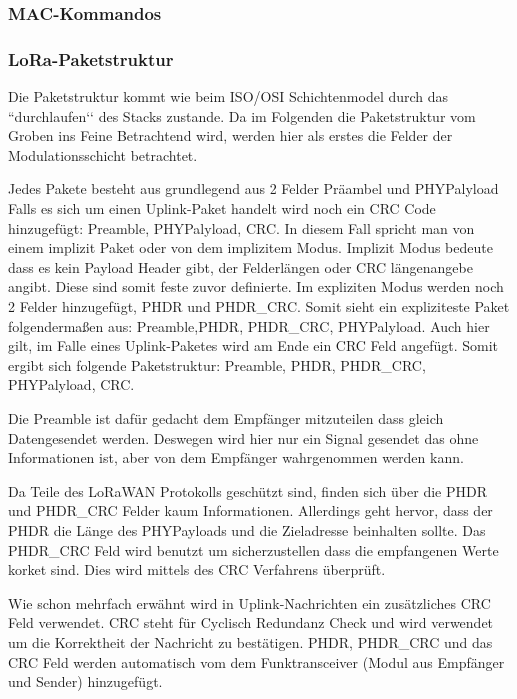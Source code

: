\documentclass[a4paper,12pt]{article}
\begin{document}
            \subsubsection{MAC-Kommandos}
            \subsubsection{LoRa-Paketstruktur}
            Die Paketstruktur kommt wie beim ISO/OSI Schichtenmodel durch das ``durchlaufen‘‘ des Stacks zustande. 
            Da im Folgenden die Paketstruktur vom Groben ins Feine Betrachtend wird, werden hier als erstes die Felder
            der Modulationsschicht betrachtet.

            Jedes Pakete besteht aus grundlegend aus 2 Felder Präambel und  PHYPalyload Falls es sich um einen 
            Uplink-Paket handelt wird noch ein CRC Code hinzugefügt: Preamble, PHYPalyload, CRC. 
            In diesem Fall spricht man von einem implizit Paket oder von dem implizitem Modus. Implizit Modus bedeute 
            dass es kein Payload Header gibt, der Felderlängen oder CRC längenangebe angibt. Diese sind somit feste 
            zuvor definierte. Im expliziten Modus werden noch 2 Felder hinzugefügt, PHDR und PHDR\_CRC. Somit sieht 
            ein expliziteste Paket folgendermaßen aus:  Preamble,PHDR, PHDR\_CRC, PHYPalyload. Auch hier gilt, im Falle
             eines Uplink-Paketes wird am Ende ein CRC Feld angefügt. Somit ergibt sich folgende Paketstruktur: 
             Preamble, PHDR, PHDR\_CRC, PHYPalyload, CRC.

            Die Preamble ist dafür gedacht dem Empfänger mitzuteilen dass gleich Datengesendet werden. Deswegen wird 
            hier nur ein Signal gesendet das ohne Informationen ist, aber von dem Empfänger wahrgenommen werden kann.

            Da Teile des LoRaWAN Protokolls geschützt sind, finden sich über die PHDR und PHDR\_CRC Felder kaum 
            Informationen. Allerdings geht hervor, dass der PHDR die Länge des PHYPayloads und die Zieladresse 
            beinhalten sollte.
            Das PHDR\_CRC Feld wird benutzt um sicherzustellen dass die empfangenen Werte korket sind. Dies wird  
            mittels des CRC Verfahrens überprüft.
            
            Wie schon mehrfach erwähnt wird in Uplink-Nachrichten ein zusätzliches CRC Feld verwendet. CRC steht für 
            Cyclisch Redundanz Check und wird verwendet um die Korrektheit der Nachricht zu bestätigen. PHDR, PHDR\_CRC 
            und das CRC Feld werden automatisch vom dem Funktransceiver (Modul aus Empfänger und Sender) hinzugefügt.
\end{document}
